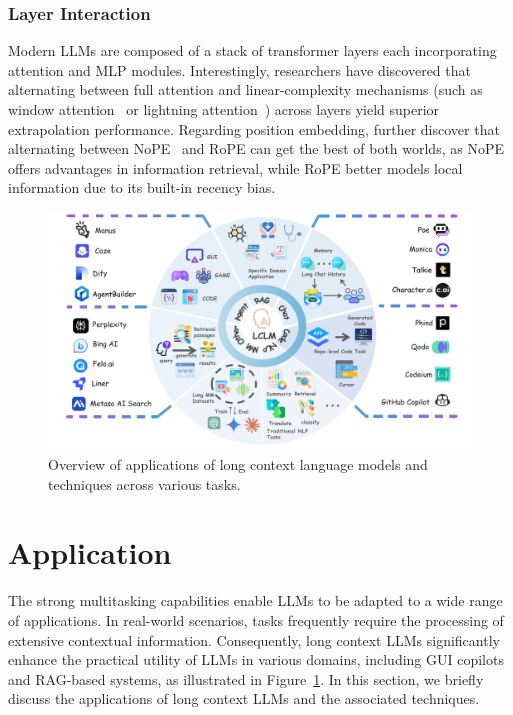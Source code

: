 \documentclass[11pt, a4paper, logo, copyright, nonumbering]{map}
\begin{document}
\subsubsection{Layer Interaction}
Modern LLMs are composed of a stack of transformer layers each incorporating attention and MLP modules. Interestingly, researchers have discovered that alternating between full attention and linear-complexity mechanisms (such as window attention~\citep{yang_hybrid_attn_rope_nope} or lightning attention~\citep{minimax2025minimax01scalingfoundationmodels}) across layers yield superior extrapolation performance. Regarding position embedding,  \citet{yang_hybrid_attn_rope_nope} further discover that alternating between NoPE~\citep{kazemnejad2024impact} and RoPE can get the best of both worlds, as NoPE offers advantages in information retrieval, while RoPE better models local information due to its built-in recency bias.













\begin{figure}[!t]
    \centering
    \includegraphics[width=1.0\textwidth]{Sec8_Application/application.pdf}
    \caption{Overview of applications of long context language models and techniques across various tasks.}
    \label{fig:fig_applications_main}
    \vspace{3mm}
\end{figure}


\section{Application}
\label{sec:application}
The strong multitasking capabilities enable LLMs to be adapted to a wide range of applications. In real-world scenarios, tasks frequently require the processing of extensive contextual information. Consequently, long context LLMs significantly enhance the practical utility of LLMs in various domains, including GUI copilots and RAG-based systems, as illustrated in Figure~\ref{fig:fig_applications_main}. In this section, we briefly discuss the applications of long context LLMs and the associated techniques. 
\end{document}
